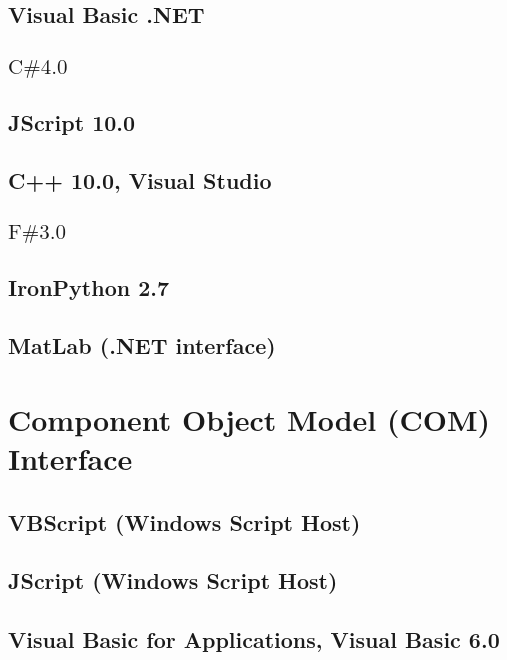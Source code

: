 \documentclass[12pt,a4paper,openany]{book}
\begin{document}
\section{Visual Basic .NET}

\section{\texorpdfstring {$\text {C\# 4.0 } $}{CSharp}}

\section{JScript 10.0}

\section{C++ 10.0, Visual Studio}

\section{\texorpdfstring {$\text {F\# 3.0 } $}{FSharp}}

\section{IronPython 2.7}

\section{MatLab (.NET interface)}

\chapter{Component Object Model (COM) Interface}

\section{VBScript (Windows Script Host)}

\section{JScript (Windows Script Host)}

\section{Visual Basic for Applications, Visual Basic 6.0}
\end{document}
